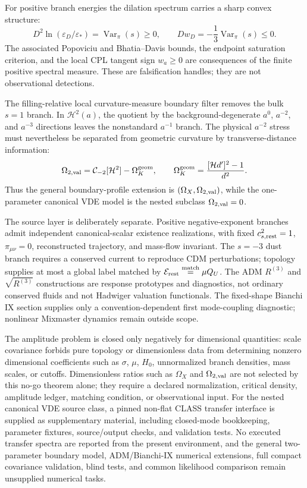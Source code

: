 \documentclass[11pt,a4paper]{article}
\def\Dil{D}%
\def\QU{Q_U}%
\numberwithin{equation}{section}
\theoremstyle{definition}
\theoremstyle{plain}
\theoremstyle{remark}
\newcommand{\Dil}{\mathscr{D}}
\newcommand{\epsD}{\varepsilon_D}
\newcommand{\QU}{Q_U}
\begin{document}
For positive branch energies the dilation spectrum carries a sharp convex
structure:
\begin{equation}
\Dil^2\ln(\epsD/\varepsilon_*)=\operatorname{Var}_\pi(s)\ge0,
\qquad
\Dil w_D=-\frac13\operatorname{Var}_\pi(s)\le0.
\end{equation}
The associated Popoviciu and Bhatia--Davis bounds, the endpoint saturation
criterion, and the local CPL tangent sign \(w_a\ge0\) are consequences of the
finite positive spectral measure.  These are falsification handles; they are not observational detections.

The filling-relative local curvature-measure boundary filter removes the bulk
\(s=1\) branch.  In \(\mathcal H^2(a)\), the quotient by the background-degenerate
\(a^0\), \(a^{-2}\), and \(a^{-3}\) directions leaves the nonstandard
\(a^{-1}\) branch.  The physical \(a^{-2}\) stress must nevertheless be separated
from geometric curvature by transverse-distance information:
\begin{equation}
\Omega_{2,{\rm val}}=\mathcal C_{-2}[\mathcal H^2]-\Omega_K^{\rm geom},
\qquad
\Omega_K^{\rm geom}=\frac{[\mathcal H d']^2-1}{d^2}.
\end{equation}
Thus the general boundary-profile extension is \((\Omega_X,\Omega_{2,{\rm val}})\), while the one-parameter canonical VDE model is the nested subclass \(\Omega_{2,{\rm val}}=0\).

The source layer is deliberately separate.  Positive negative-exponent branches
admit independent canonical-scalar existence realizations, with fixed
\(c_{s,{\rm rest}}^2=1\), \(\pi_{\mu\nu}=0\), reconstructed trajectory, and mass-flow invariant.  The \(s=-3\) dust branch requires a conserved current to reproduce CDM perturbations; topology supplies at most a global label matched by \(\mathcal E_{\rm rest}\overset{\rm match}{=}\mu\QU\).  The ADM \(R^{(3)}\) and \(\sqrt{R^{(3)}}\) constructions are response prototypes and diagnostics, not ordinary conserved fluids and not Hadwiger valuation functionals.  The fixed-shape Bianchi IX section supplies only a convention-dependent first mode-coupling diagnostic; nonlinear Mixmaster dynamics remain outside scope.

The amplitude problem is closed only negatively for dimensional quantities: scale covariance forbids pure topology or dimensionless data from determining nonzero dimensional coefficients such as \(\sigma\), \(\mu\), \(H_0\), unnormalized branch densities, mass scales, or cutoffs.  Dimensionless ratios such as \(\Omega_X\) and \(\Omega_{2,{\rm val}}\) are not selected by this no-go theorem alone; they require a declared normalization, critical density, amplitude ledger, matching condition, or observational input.  For the nested canonical VDE source class, a pinned non-flat CLASS transfer interface is supplied as supplementary material, including closed-mode bookkeeping, parameter fixtures, source/output checks, and validation tests.  No executed transfer spectra are reported from the present environment, and the general two-parameter boundary model, ADM/Bianchi-IX numerical extensions, full compact covariance validation, blind tests, and common likelihood comparison remain unsupplied numerical tasks.
\end{document}
